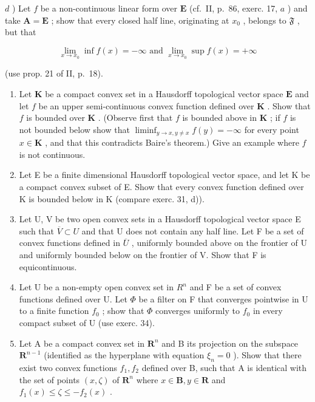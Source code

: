 \(d\) ) Let \(f\) be a non-continuous linear form over \(\mathbf{E}\) (cf.~II, p.~86, exerc. 17, \(a\) ) and take \(\mathbf{A} = \mathbf{E}\) ; show that every closed half line, originating at \(x_0\) , belongs to \(\mathfrak{F}\) , but that

\[
\lim _ {x \to x _ {0}} \inf f (x) = - \infty \text { and } \lim _ {x \to x _ {0}} \sup f (x) = + \infty
\]

(use prop. 21 of II, p.~18).

\begin{enumerate}
\def\labelenumi{\arabic{enumi})}
\setcounter{enumi}{31}
\item
  Let \(\mathbf{K}\) be a compact convex set in a Hausdorff topological vector space \(\mathbf{E}\) and let \(f\) be an upper semi-continuous convex function defined over \(\mathbf{K}\) . Show that \(f\) is bounded over \(\mathbf{K}\) . (Observe first that \(f\) is bounded above in \(\mathbf{K}\) ; if \(f\) is not bounded below show that \(\liminf_{y\to x,y\neq x}f(y) = -\infty\) for every point \(x\in \mathbf{K}\) , and that this contradicts Baire's theorem.) Give an example where \(f\) is not continuous.
\item
  Let E be a finite dimensional Hausdorff topological vector space, and let K be a compact convex subset of E. Show that every convex function defined over K is bounded below in K (compare exerc. 31, d)).
\item
  Let U, V be two open convex sets in a Hausdorff topological vector space E such that \(\overline{V} \subset U\) and that U does not contain any half line. Let F be a set of convex functions defined in \(\overline{U}\) , uniformly bounded above on the frontier of U and uniformly bounded below on the frontier of V. Show that F is equicontinuous.
\item
  Let U be a non-empty open convex set in \(R^{n}\) and F be a set of convex functions defined over U. Let \(\Phi\) be a filter on F that converges pointwise in U to a finite function \(f_{0}\) ; show that \(\Phi\) converges uniformly to \(f_{0}\) in every compact subset of U (use exerc. 34).
\item
  Let A be a compact convex set in \(\mathbf{R}^n\) and B its projection on the subspace \(\mathbf{R}^{n-1}\) (identified as the hyperplane with equation \(\xi_n = 0\) ). Show that there exist two convex functions \(f_1, f_2\) defined over B, such that A is identical with the set of points \((x, \zeta)\) of \(\mathbf{R}^n\) where \(x \in \mathbf{B}, y \in \mathbf{R}\) and \(f_1(x) \leqslant \zeta \leqslant -f_2(x)\) .

\end{enumerate}
